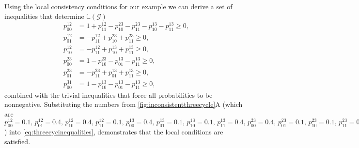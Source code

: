 Using the local consistency conditions for our example we can derive a set of inequalities that determine $\mathbb{L}(\mathcal{G})$
\begin{equation}
\begin{aligned}\label{eq:threecycinequalities}
p^{12}_{00} &= 1 + p^{12}_{11} - p^{23}_{10} - p^{23}_{11} - p^{13}_{10} - p^{13}_{11} \geq 0, \\
p^{12}_{01} &= -p^{12}_{11} + p^{23}_{10} + p^{23}_{11} \geq 0,\\
p^{12}_{10} &= -p^{12}_{11} + p^{13}_{10} + p^{13}_{11} \geq 0,\\
p^{23}_{00} &= 1-p^{23}_{10} - p^{13}_{01} - p^{13}_{11} \geq 0,\\
p^{23}_{01} &= -p^{23}_{11} + p^{13}_{01} + p^{13}_{11} \geq 0,\\
p^{31}_{00} &= 1-p^{13}_{10} - p^{13}_{01} - p^{13}_{11} \geq 0,
\end{aligned}
\end{equation}
combined with the trivial inequalities that force all probabilities to be nonnegative. Substituting the numbers from \ref{fig:inconsistentthreecycle}A (which are $p^{12}_{00} = 0.1,\, p^{12}_{01} = 0.4,\, p^{12}_{10} = 0.4,\,p^{12}_{11} = 0.1,\,p^{13}_{00} = 0.4,\, p^{13}_{01} = 0.1,\, p^{13}_{10} = 0.1,\,p^{13}_{11} = 0.4,\,p^{23}_{00} = 0.4,\, p^{23}_{01} = 0.1,\, p^{23}_{10} = 0.1,\,p^{23}_{11} = 0.4 $) into \ref{eq:threecycinequalities}, demonstrates that the local conditions are satisfied.

